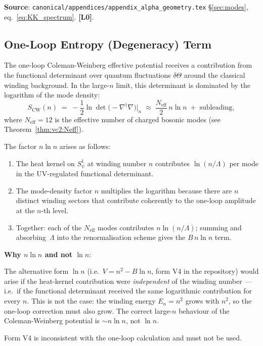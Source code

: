 \documentclass[12pt,a4paper]{article}
\theoremstyle{definition}
\theoremstyle{remark}
\newcommand{\Lzero}{\textbf{[L0]}}
\begin{document}
\begin{resultbox}
\textbf{Source}: \texttt{canonical/appendices/appendix\_alpha\_geometry.tex}
§\ref{sec:modes}, eq.~\eqref{eq:KK_spectrum}.  \Lzero.
\end{resultbox}

\subsection{One-Loop Entropy (Degeneracy) Term}
\label{sec:vc2:entropy}

The one-loop Coleman-Weinberg effective potential receives a contribution
from the functional determinant over quantum fluctuations $\delta\Theta$
around the classical winding background.
In the large-$n$ limit, this determinant is dominated by the logarithm of the
mode density:
\begin{equation}
  S_{\mathrm{CW}}(n)
  \;=\;
  -\frac{1}{2}\ln\det\bigl(-\nabla^\dagger\nabla\bigr)\big|_n
  \;\approx\;
  \frac{N_{\mathrm{eff}}}{2}\,n\ln n
  \;+\; \text{subleading},
  \label{eq:vc2:CW}
\end{equation}
where $N_{\mathrm{eff}} = 12$ is the effective number of charged bosonic modes
(see Theorem~\ref{thm:vc2:Neff}).

The factor $n\ln n$ arises as follows:
\begin{enumerate}
  \item The heat kernel on $S^1_\psi$ at winding number $n$ contributes
        $\ln(n/\Lambda)$ per mode in the UV-regulated functional determinant.
  \item The mode-density factor $n$ multiplies the logarithm because there
        are $n$ distinct winding sectors that contribute coherently to the
        one-loop amplitude at the $n$-th level.
  \item Together: each of the $N_{\mathrm{eff}}$ modes contributes
        $n\ln(n/\Lambda)$; summing and absorbing~$\Lambda$ into the
        renormalisation scheme gives the $B\,n\ln n$ term.
\end{enumerate}

\begin{infobox}
\textbf{Why $n\ln n$ and not $\ln n$}:

The alternative form $\ln n$ (i.e.\ $V = n^2 - B\ln n$, form V4 in the
repository) would arise if the heat-kernel contribution were \emph{independent}
of the winding number — i.e.\ if the functional determinant received the same
logarithmic contribution for every $n$.  This is not the case: the winding
energy $E_n = n^2$ grows with $n^2$, so the one-loop correction must also grow.
The correct large-$n$ behaviour of the Coleman-Weinberg potential is
$\sim n\ln n$, not $\ln n$.

Form V4 is inconsistent with the one-loop calculation and must not be used.
\end{infobox}
\end{document}
